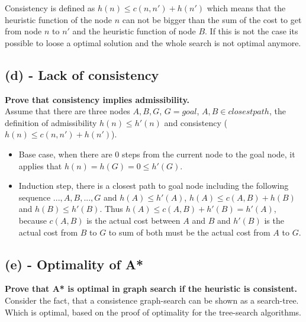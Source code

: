 \documentclass{article}
\begin{document}
\begin{spacing}{1.2}
Consistency is defined as $h(n) \leq c(n,n') + h(n')$ which means that the heuristic function of the node $n$ can not be bigger than the sum of the cost to get from node $n$ to $n'$ and the heuristic function of node $B$. If this is not the case its possible to loose a optimal solution and the whole search is not optimal anymore. 

\subsection{(d) - Lack of consistency }

\textbf{Prove that consistency implies admissibility.}\\
Assume that there are three nodes $A, B, G$, $G = goal$, $A, B \in closest path$, the definition of admissibility  $h(n)\leq h'(n)$  and consistency ($h(n) \leq c(n,n') + h(n')$).
\begin{itemize}
\item Base case, when there are 0 steps from the current node to the goal node, it applies that $h(n) = h(G) = 0 \leq h'(G)$.
\item Induction step, there is a closest path to goal node including the following sequence $...,A,B,...,G$ and $h(A) \leq h'(A)$, $h(A) \leq c(A,B) + h(B)$ and $h(B) \leq h'(B)$. Thus $h(A) \leq c(A,B) + h'(B) = h'(A)$, because $c(A,B)$ is the actual cost between $A$ and $B$ and $h'(B)$ is the actual cost from $B$ to $G$ to sum of both must be the actual cost from $A$ to $G$.
\end{itemize}

\subsection{(e) - Optimality of A* }

\textbf{Prove that A* is optimal in graph search if the heuristic is consistent.}\\
Consider the fact, that a consistence graph-search can be shown as a search-tree. Which is optimal, based on the proof of optimality for the tree-search algorithms. 

\end{spacing}
\end{document}
